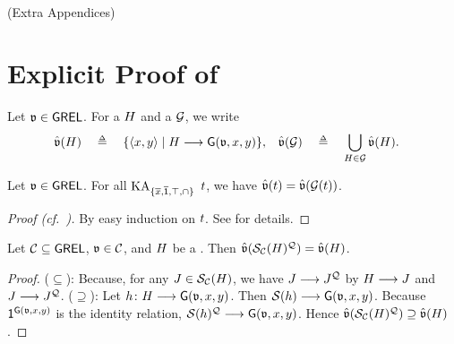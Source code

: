 
\newpage
\ 
\newpage

(Extra Appendices)







\section{Explicit Proof of }\label{section: theorem: graph characterization}
Let $\mathfrak{v} \in \mathsf{GREL}$.
For a  $\graph[2]$ and a  $\glang$, we write
\begin{align*}
    \hat{\val}(\graph[2]) & \quad\defeq\quad \set{\tuple{x, y} \mid \graph[2] \homo \const{\graph}(\val, x, y)}, & \hat{\val}(\glang) & \quad\defeq\quad \bigcup_{\graph[2] \in \glang} \hat{\val}(\graph[2]).
\end{align*}
\begin{lemma}\label{lemma: glang val}
    Let $\mathfrak{v} \in \mathsf{GREL}$.
    For all $\mathrm{KA}_{\{\overline{x}, \overline{\mathsf{1}}, \top, \cap\}}$  $\term$,
    we have $\hat{\val}(\term) = \hat{\val}(\glang(\term))$.
\end{lemma}
\begin{proof}[Proof (cf.\ {\cite[Prop.\  11]{nakamuraExistentialCalculiRelations2023}})]
    By easy induction on $\term$.
    See  for details.
\end{proof}

\begin{lemma}\label{lemma: QS}
    Let $\algclass \subseteq \GREL$, $\val \in \algclass$, and $\graph[2]$ be a .
    Then $\hat{\val}(\FillS_{\algclass}(\graph[2])^{\FillQ}) = \hat{\val}(\graph[2])$.
\end{lemma}
\begin{proof}
    ($\subseteq$):
    Because, for any $\graph[3] \in \FillS_{\algclass}(\graph[2])$, 
    we have $\graph[3] \homo \graph[3]^{\FillQ}$ by $\graph[2] \homo \graph[3]$ and $\graph[3] \homo \graph[3]^{\FillQ}$.
    ($\supseteq$):
    Let $h \colon \graph[2] \homo \const{\graph}(\val, x, y)$.
    Then $\FillS(h) \homo \const{\graph}(\val, x, y)$.
    Because $\id^{\const{\graph}(\val, x, y)}$ is the identity relation, $\FillS(h)^{\FillQ} \homo \const{\graph}(\val, x, y)$.
    Hence $\hat{\val}(\FillS_{\algclass}(\graph[2])^{\FillQ}) \supseteq \hat{\val}(\graph[2])$.
\end{proof}


